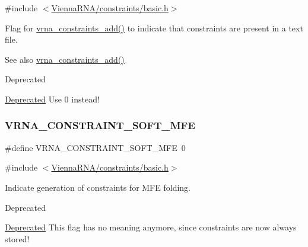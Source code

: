 {\ttfamily \#include $<$\mbox{\hyperlink{constraints_2basic_8h}{Vienna\+R\+N\+A/constraints/basic.\+h}}$>$}



Flag for \mbox{\hyperlink{group__constraints_ga35a401f680969a556858a8dd5f1d07cc}{vrna\+\_\+constraints\+\_\+add()}} to indicate that constraints are present in a text file. 

\begin{DoxySeeAlso}{See also}
\mbox{\hyperlink{group__constraints_ga35a401f680969a556858a8dd5f1d07cc}{vrna\+\_\+constraints\+\_\+add()}} 
\end{DoxySeeAlso}
\begin{DoxyRefDesc}{Deprecated}
\item[\mbox{\hyperlink{deprecated__deprecated000154}{Deprecated}}]Use 0 instead!\end{DoxyRefDesc}
\mbox{\label{group__constraints_ga62aa195893d02d1a79ca94952748df36}} 
\subsubsection{\texorpdfstring{VRNA\_CONSTRAINT\_SOFT\_MFE}{VRNA\_CONSTRAINT\_SOFT\_MFE}}
{\footnotesize\ttfamily \#define V\+R\+N\+A\+\_\+\+C\+O\+N\+S\+T\+R\+A\+I\+N\+T\+\_\+\+S\+O\+F\+T\+\_\+\+M\+FE~0}



{\ttfamily \#include $<$\mbox{\hyperlink{constraints_2basic_8h}{Vienna\+R\+N\+A/constraints/basic.\+h}}$>$}



Indicate generation of constraints for M\+FE folding. 

\begin{DoxyRefDesc}{Deprecated}
\item[\mbox{\hyperlink{deprecated__deprecated000155}{Deprecated}}]This flag has no meaning anymore, since constraints are now always stored!\end{DoxyRefDesc}
\mbox{\label{group__constraints_ga03fb5000c19b9a2082bf4ea30a543045}} 
